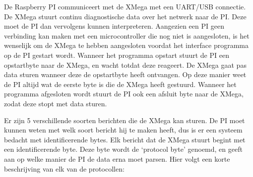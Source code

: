De Raspberry PI communiceert met de XMega met een UART/USB connectie. De XMega stuurt continu diagnostische data over het netwerk naar de PI. Deze moet de PI dan vervolgens kunnen interpreteren. Aangezien een PI geen verbinding kan maken met een microcontroller die nog niet is aangesloten, is het wenselijk om de XMega te hebben aangesloten voordat het interface programma op de PI gestart wordt. Wanneer het programma opstart stuurt de PI een opstartbyte naar de XMega, en wacht totdat deze reageert. De XMega gaat pas data sturen wanneer deze de opstartbyte heeft ontvangen. Op deze manier weet de PI altijd wat de eerste byte is die de XMega heeft gestuurd. Wanneer het programma afgesloten wordt stuurt de PI ook een afsluit byte naar de XMega, zodat deze stopt met data sturen.

Er zijn 5 verschillende soorten berichten die de XMega kan sturen. De PI moet kunnen weten met welk soort bericht hij te maken heeft, dus is er een systeem bedacht met identificerende bytes. Elk bericht dat de XMega stuurt begint met een identificerende byte. Deze byte wordt de `protocol byte' genoemd, en geeft aan op welke manier de PI de data erna moet parsen. Hier volgt een korte beschrijving van elk van de protocollen:

